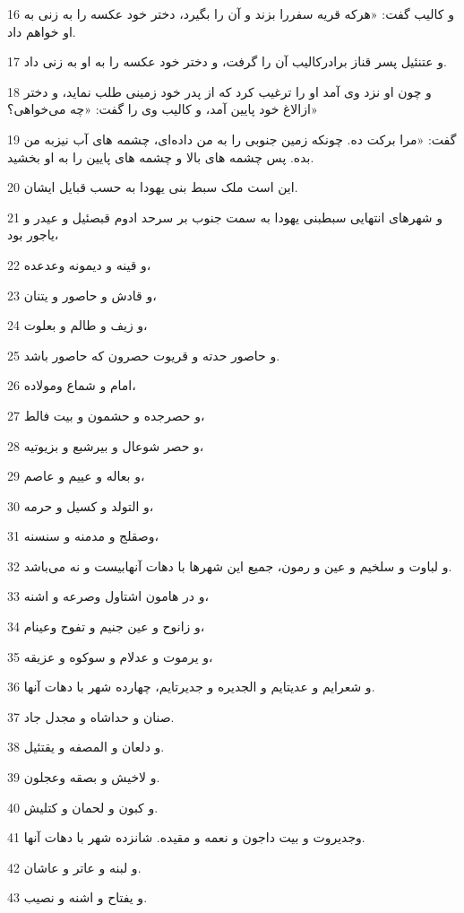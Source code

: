 \par 16 و کالیب گفت: «هر‌که قریه سفررا بزند و آن را بگیرد، دختر خود عکسه را به زنی به او خواهم داد.
\par 17 و عتنئیل پسر قناز برادرکالیب آن را گرفت، و دختر خود عکسه را به او به زنی داد.
\par 18 و چون او نزد وی آمد او را ترغیب کرد که از پدر خود زمینی طلب نماید، و دختر ازالاغ خود پایین آمد، و کالیب وی را گفت: «چه می‌خواهی؟»
\par 19 گفت: «مرا برکت ده. چونکه زمین جنوبی را به من داده‌ای، چشمه های آب نیزبه من بده. پس چشمه های بالا و چشمه های پایین را به او بخشید.
\par 20 این است ملک سبط بنی یهودا به حسب قبایل ایشان.
\par 21 و شهرهای انتهایی سبطبنی یهودا به سمت جنوب بر سرحد ادوم قبصئیل و عیدر و یاجور بود،
\par 22 و قینه و دیمونه وعدعده،
\par 23 و قادش و حاصور و یتنان،
\par 24 و زیف و طالم و بعلوت،
\par 25 و حاصور حدته و قریوت حصرون که حاصور باشد.
\par 26 امام و شماع ومولاده،
\par 27 و حصرجده و حشمون و بیت فالط،
\par 28 و حصر شوعال و بیرشبع و بزیوتیه،
\par 29 و بعاله و عییم و عاصم،
\par 30 و التولد و کسیل و حرمه،
\par 31 وصقلج و مدمنه و سنسنه،
\par 32 و لباوت و سلخیم و عین و رمون، جمیع این شهرها با دهات آنهابیست و نه می‌باشد.
\par 33 و در هامون اشتاول وصرعه و اشنه، 
\par 34 و زانوح و عین جنیم و تفوح وعینام،
\par 35 و یرموت و عدلام و سوکوه و عزیقه،
\par 36 و شعرایم و عدیتایم و الجدیره و جدیرتایم، چهارده شهر با دهات آنها.
\par 37 صنان و حداشاه و مجدل جاد.
\par 38 و دلعان و المصفه و یقتئیل.
\par 39 و لاخیش و بصقه وعجلون.
\par 40 و کبون و لحمان و کتلیش.
\par 41 وجدیروت و بیت داجون و نعمه و مقیده. شانزده شهر با دهات آنها.
\par 42 و لبنه و عاتر و عاشان.
\par 43 و یفتاح و اشنه و نصیب.

